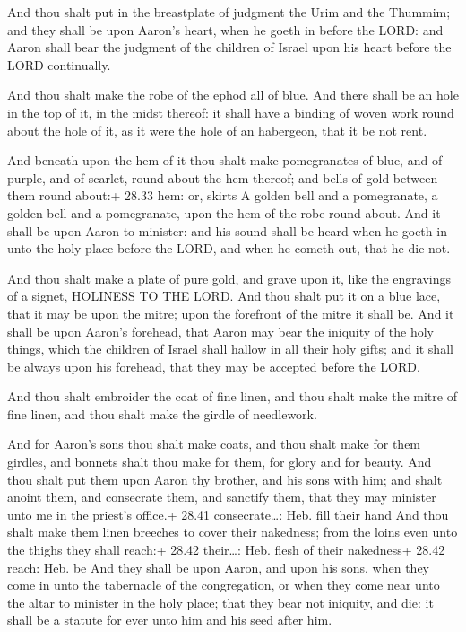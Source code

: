  And thou shalt put in the breastplate of judgment the
Urim and the Thummim; and they shall be upon Aaron's heart, when he
goeth in before the LORD: and Aaron shall bear the judgment of the
children of Israel upon his heart before the LORD continually.

 And thou shalt make the robe of the ephod all of blue.
 And there shall be an hole in the top of it, in the midst
thereof: it shall have a binding of woven work round about the hole of
it, as it were the hole of an habergeon, that it be not rent.

 And beneath upon the hem of it thou shalt make
pomegranates of blue, and of purple, and of scarlet, round about the hem
thereof; and bells of gold between them round about:+ 28.33 hem: or,
skirts  A golden bell and a pomegranate, a golden bell and
a pomegranate, upon the hem of the robe round about.  And
it shall be upon Aaron to minister: and his sound shall be heard when he
goeth in unto the holy place before the LORD, and when he cometh out,
that he die not.

 And thou shalt make a plate of pure gold, and grave upon
it, like the engravings of a signet, HOLINESS TO THE LORD. 
And thou shalt put it on a blue lace, that it may be upon the mitre;
upon the forefront of the mitre it shall be.  And it shall
be upon Aaron's forehead, that Aaron may bear the iniquity of the holy
things, which the children of Israel shall hallow in all their holy
gifts; and it shall be always upon his forehead, that they may be
accepted before the LORD.

 And thou shalt embroider the coat of fine linen, and
thou shalt make the mitre of fine linen, and thou shalt make the girdle
of needlework.

 And for Aaron's sons thou shalt make coats, and thou
shalt make for them girdles, and bonnets shalt thou make for them, for
glory and for beauty.  And thou shalt put them upon Aaron
thy brother, and his sons with him; and shalt anoint them, and
consecrate them, and sanctify them, that they may minister unto me in
the priest's office.+ 28.41 consecrate\ldots: Heb. fill their hand
 And thou shalt make them linen breeches to cover their
nakedness; from the loins even unto the thighs they shall reach:+ 28.42
their\ldots: Heb. flesh of their nakedness+ 28.42 reach: Heb. be
 And they shall be upon Aaron, and upon his sons, when they
come in unto the tabernacle of the congregation, or when they come near
unto the altar to minister in the holy place; that they bear not
iniquity, and die: it shall be a statute for ever unto him and his seed
after him.

